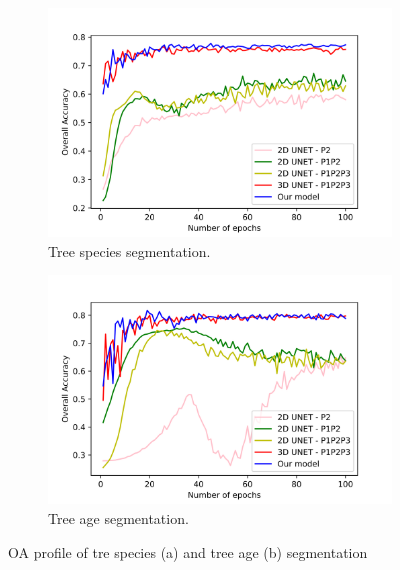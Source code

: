 \begin{figure}[p]
    \centering
    \begin{subfigure}{\textwidth}
        \centering
        \includegraphics[width=\textwidth]{figs/chap5/spec_acc.png}
        \caption{Tree species segmentation.}
        \label{fig:chap5_fig4}
    \end{subfigure}

    \begin{subfigure}{\textwidth}
        \centering
        \includegraphics[width=\textwidth]{figs/chap5/age_acc.png}
        \caption{Tree age segmentation.}
        \label{fig:chap5_fig5}
    \end{subfigure}
    \caption[Study area and annotated data]{OA profile of tre species (a) and tree age (b) segmentation}
    \label{fig:chap5_fig45}
\end{figure}

